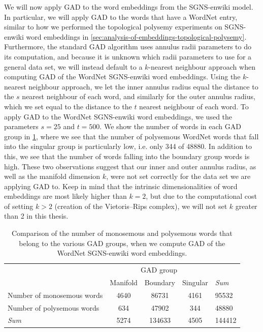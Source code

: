 We will now apply GAD to the word embeddings from the SGNS-enwiki model. In particular, we will apply GAD to the words that have a WordNet entry, similar to how we performed the topological polysemy experiments on SGNS-enwiki word embeddings in \cref{sec:analysis-of-embeddings-topological-polysemy}. Furthermore, the standard GAD algorithm uses annulus radii parameters to do its computation, and because it is unknown which radii parameters to use for a general data set, we will instead default to a $k$-nearest neighbour approach when computing GAD of the WordNet SGNS-enwiki word embeddings. Using the $k$-nearest neighbour approach, we let the inner annulus radius equal the distance to the $s$ nearest neighbour of each word, and similarly for the outer annulus radius, which we set equal to the distance to the $t$ nearest neighbour of each word. To apply GAD to the WordNet SGNS-enwiki word embeddings, we used the parameters $s=25$ and $t=500$. We show the number of words in each GAD group in \cref{table:number-of-words-gad-polysemous-sgns-enwiki-wordnet}, where we see that the number of polysemous WordNet words that fall into the singular group is particularly low, i.e. only 344 of 48880. In addition to this, we see that the number of words falling into the boundary group words is high. These two observations suggest that our inner and outer annulus radius, as well as the manifold dimension $k$, were not set correctly for the data set we are applying GAD to. Keep in mind that the intrinsic dimensionalities of word embeddings are most likely higher than $k=2$, but due to the computational cost of setting $k > 2$ (creation of the Vietoris–Rips complex), we will not set $k$ greater than 2 in this thesis.
\begin{table}[H]
    \centering
    \begin{tabular}{@{}lcccl@{}}
    \toprule
    \multicolumn{1}{c}{}       & \multicolumn{3}{c}{GAD group}  & \multicolumn{1}{l}{} \\ \cmidrule(lr){2-4}
    \multicolumn{1}{c}{}       & Manifold & Boundary & Singular & \textit{Sum}                  \\ \midrule
    \trcolor Number of monosemous words            & 4640     & 86731    & 4161     & 95532                \\
    Number of polysemous words & 634      & 47902    & 344      & 48880                \\ \midrule
    \trcolor \textit{Sum}                        & 5274     & 134633   & 4505     & 144412 \\ \bottomrule
    \end{tabular}
    \caption{Comparison of the number of monosemous and polysemous words that belong to the various GAD groups, when we compute GAD of the WordNet SGNS-enwiki word embeddings.}
    \label{table:number-of-words-gad-polysemous-sgns-enwiki-wordnet}
\end{table}

